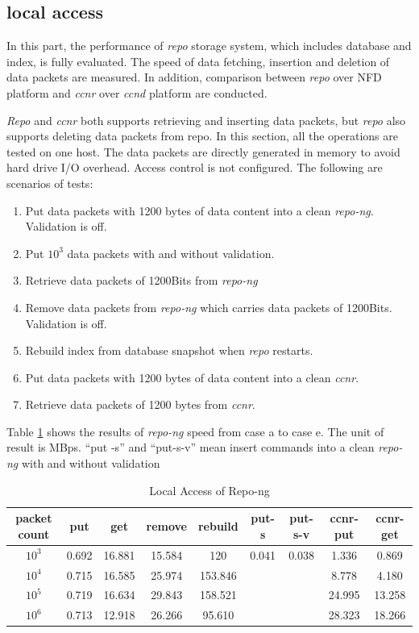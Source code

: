 \documentclass[conference]{IEEEtran}
\begin{document}
\subsection{local access}
In this part, the performance of \emph{repo} storage system, which includes database and index, is fully evaluated. The speed of data fetching, insertion and deletion of data packets are measured. In addition, comparison between \emph{repo} over NFD platform and \emph{ccnr} over \emph{ccnd} platform are conducted.

\emph{Repo} and \emph{ccnr} both supports retrieving and inserting data packets, but \emph{repo} also supports deleting data packets from repo. In this section, all the operations are tested on one host. The data packets are directly generated in memory to avoid hard drive I/O overhead. Access control is not configured. The following are scenarios of tests:

\begin{enumerate}[a]
\item Put data packets with 1200 bytes of data content into a clean \emph{repo-ng}. Validation is off.
\item Put $10^3$ data packets with and without validation.
\item Retrieve data packets of 1200Bits from \emph{repo-ng}
\item Remove data packets from \emph{repo-ng} which carries data packets of 1200Bits. Validation is off.
\item Rebuild index from database snapshot when \emph{repo} restarts.
\item Put data packets with 1200 bytes of data content into a clean \emph{ccnr}.
\item Retrieve data packets of 1200 bytes from \emph{ccnr}.
\end{enumerate}

Table \ref{local-repo} shows the results of \emph{repo-ng} speed from case a to case e. The unit of result is MBps. ``put -s'' and ``put-s-v'' mean insert commands into a clean \emph{repo-ng} with and without validation

\begin{table}[htbp]
\centering
\caption{Local Access of Repo-ng}
\label{local-repo}
\begin{tabular}{ | c | c | c | c | c | c | c | c | c | }
    \hline
    packet count & put & get & remove & rebuild & put-s & put-s-v & ccnr-put & ccnr-get \\ \hline
    $10^3$ & 0.692 & 16.881 & 15.584 & 120 & 0.041 & 0.038  & 1.336 & 0.869\\ \hline
    $10^4$ & 0.715 & 16.585 & 25.974 & 153.846 & & & 8.778 & 4.180 \\ \hline
    $10^5$ & 0.719 & 16.634 & 29.843 & 158.521 & & & 24.995 & 13.258 \\ \hline
    $10^6$ & 0.713 & 12.918 & 26.266 & 95.610 & & & 28.323 & 18.266\\ \hline
\end{tabular}
\end{table}
\end{document}
